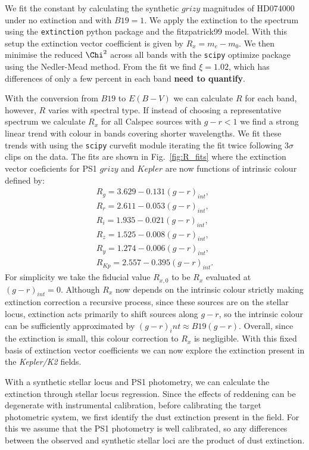 \documentclass{aastex63}
\begin{document}
We fit the constant by calculating the synthetic $grizy$ magnitudes of HD074000 under no extinction and with $B19=1$. We apply the extinction to the spectrum using the \texttt{extinction} python package and the fitzpatrick99 model. With this setup the extinction vector coefficient is given by $R_x=m_e-m_0$. We then minimise the reduced $\Chi^2$ across all bands with the \texttt{scipy} optimize package using the Nedler-Mead method. From the fit we find $\xi = 1.02$, which has differences of only a few percent in each band \textbf{need to quantify}. 

With the conversion from $B19$ to $E(B-V)$ we can calculate $R$ for each band, however, $R$ varies with spectral type. If instead of choosing a representative spectrum we calculate $R_x$ for all Calspec sources with $g-r < 1$ we find a strong linear trend with colour in bands covering shorter wavelengths. We fit these trends with using the \texttt{scipy} curvefit module iterating the fit twice following $3\sigma$ clips on the data. The fits are shown in Fig.~\ref{fig:R_fits} where the extinction vector coeficients for PS1 $grizy$ and $Kepler$ are now functions of intrinsic colour defined by:
\begin{eqnarray} 
R_g=3.629-0.131(g-r)_{int},\label{eqn:vectors}\\
R_r=2.611-0.053(g-r)_{int},\nonumber \\
R_i=1.935-0.021(g-r)_{int},\nonumber\\
R_z=1.525-0.008(g-r)_{int},\nonumber\\
R_y=1.274-0.006(g-r)_{int},\nonumber\\
R_{Kp}=2.557-0.395(g-r)_{int}.\nonumber
\end{eqnarray}
For simplicity we take the fiducial value $R_{x,0}$ to be $R_x$ evaluated at $(g-r)_{int}=0$. Although $R_x$ now depends on the intrinsic colour strictly making extinction correction a recursive process, since these sources are on the stellar locus, extinction acts primarily to shift sources along $g-r$, so the intrinsic colour can be sufficiently approximated by $(g-r)_int\approx B19(g-r)$. Overall, since the extinction is small, this colour correction to $R_x$ is negligible. With this fixed basis of extinction vector coefficients we can now explore the extinction present in the \textit{Kepler/K2} fields.




With a synthetic stellar locus and PS1 photometry, we can calculate the extinction through stellar locus regression. Since the effects of reddening can be degenerate with instrumental calibration, before calibrating the target photometric system, we first identify the dust extinction present in the field. For this we assume that the PS1 photometry is well calibrated, so any differences between the observed and synthetic stellar loci are the product of dust extinction. 
\end{document}
